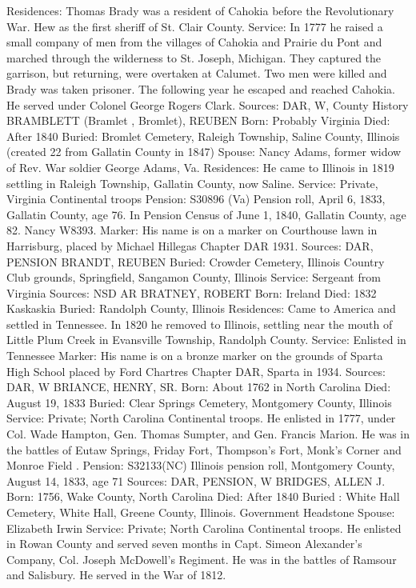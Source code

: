 Residences: Thomas Brady was a resident of Cahokia before the Revolutionary War. Hew as the first sheriff of St. Clair County. 
Service: In 1777 he raised a small company of men from the villages of Cahokia and Prairie du Pont and marched through the wilderness to St. Joseph, Michigan. They captured the garrison, but returning, were overtaken at Calumet. Two men were killed and Brady was taken prisoner. The following year he escaped and reached Cahokia. He served under Colonel George Rogers Clark. 
Sources: DAR, W, County History 
BRAMBLETT (Bramlet , Bromlet), REUBEN 
Born: Probably Virginia 
Died: After 1840 
Buried: Bromlet Cemetery, Raleigh Township, Saline County, Illinois (created 22 from Gallatin County in 1847) 
Spouse: Nancy Adams, former widow of Rev. War soldier George Adams, Va. 
Residences: He came to Illinois in 1819 settling in Raleigh Township, Gallatin County, now Saline. 
Service: Private, Virginia Continental troops 
Pension: S30896 (Va) Pension roll, April 6, 1833, Gallatin County, age 76. In Pension Census of June 1, 1840, Gallatin County, age 82. Nancy W8393. 
Marker: His name is on a marker on Courthouse lawn in Harrisburg, placed by Michael Hillegas Chapter DAR 1931. 
Sources: DAR, PENSION 
BRANDT, REUBEN 
Buried: Crowder Cemetery, Illinois Country Club grounds, Springfield, Sangamon County, Illinois 
Service: Sergeant from Virginia 
Sources: NSD AR 
BRATNEY, ROBERT 
Born: Ireland 
Died: 1832 Kaskaskia 
Buried: Randolph County, Illinois 
Residences: Came to America and settled in Tennessee. In 1820 he removed to Illinois, settling near the mouth of Little Plum Creek in Evansville Town­ship, Randolph County. 
Service: Enlisted in Tennessee 
Marker: His name is on a bronze marker on the grounds of Sparta High School placed by Ford Chartres Chapter DAR, Sparta in 1934. 
Sources: DAR, W 
BRIANCE, HENRY, SR. 
Born: About 1762 in North Carolina 
Died: August 19, 1833 
Buried: Clear Springs Cemetery, Montgomery County, Illinois 
Service: Private; North Carolina Continental troops. He enlisted in 1777, under Col. Wade Hampton, Gen. Thomas Sumpter, and Gen. Francis Marion. He was in the battles of Eutaw Springs, Friday Fort, Thompson's Fort, Monk's Corner and Monroe Field . 
Pension: S32133(NC) Illinois pension roll, Montgomery County, August 14, 1833, age 71 
Sources: DAR, PENSION, W 
BRIDGES, ALLEN J. 
Born: 1756, Wake County, North Carolina 
Died: After 1840 
Buried : White Hall Cemetery, White Hall, Greene County, Illinois. Government Headstone 
Spouse: Elizabeth Irwin 
Service: Private; North Carolina Continental troops. He enlisted in Rowan County and served seven months in Capt. Simeon Alexander's Company, Col. Joseph McDowell's Regiment. He was in the battles of Ramsour and Salisbury. He served in the War of 1812. 

